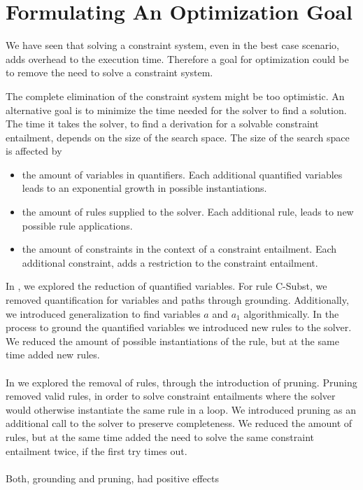 \section{Formulating An Optimization Goal} %
\label{sec:goal}
We have seen that solving a constraint system,
even in the best case scenario,
adds overhead to the execution time.
Therefore a goal for optimization could be
to remove the need to solve a constraint system.

The complete elimination of the constraint system
might be too optimistic. An alternative goal
is to minimize the time needed for the solver to find a solution.
The time it takes the solver, to find a derivation for a solvable
constraint entailment, depends on the size of the search space.
The size of the search space is affected by
\begin{itemize}
  \item the amount of variables in quantifiers.
        Each additional quantified variables leads to an exponential growth in possible instantiations.
  \item the amount of rules supplied to the solver.
        Each additional rule, leads to new possible rule applications.
  \item the amount of constraints in the context of a constraint entailment.
        Each additional constraint, adds a restriction to the constraint entailment.
\end{itemize}
In ,
we explored the reduction of quantified variables.
For rule C-Subst, we removed quantification
for variables and paths through grounding.
Additionally, we introduced generalization
to find variables $a$ and $a_1$ algorithmically.
In the process to ground the quantified variables
we introduced new rules to the solver.
We reduced the amount of possible instantiations of the rule,
but at the same time added new rules.\\
\\
In  we explored the removal of rules,
through the introduction of pruning.
Pruning removed valid rules,
in order to solve constraint entailments
where the solver would otherwise
instantiate the same rule in a loop.
We introduced pruning
as an additional call to the solver
to preserve completeness.
We reduced the amount of rules,
but at the same time added
the need to solve the same constraint entailment twice,
if the first try times out.\\
\\
Both, grounding and pruning, had positive effects
